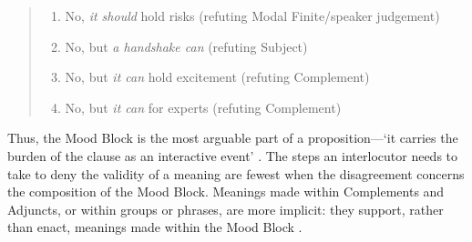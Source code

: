 \begin{quote}
\small
\begin{enumerate}	\setlength\itemsep{-0.5em}
\item No, \emph{it should} hold risks (refuting Modal Finite/speaker judgement)
\item No, but \emph{a handshake can} (refuting Subject)
\item No, but \emph{it can} hold excitement (refuting Complement)
\item No, but \emph{it can} for experts (refuting Complement)
\end{enumerate}
\end{quote}
%
Thus, the Mood Block is the most arguable part of a proposition---`it carries the burden of the clause as an interactive event' \cite[p.~118]{halliday_introduction_2004}. The steps an interlocutor needs to take to deny the validity of a meaning are fewest when the disagreement concerns the composition of the Mood Block. Meanings made within Complements and Adjuncts, or within groups or phrases, are more implicit: they support, rather than enact, meanings made within the Mood Block \cite{matthiessen_combining_2002}.



